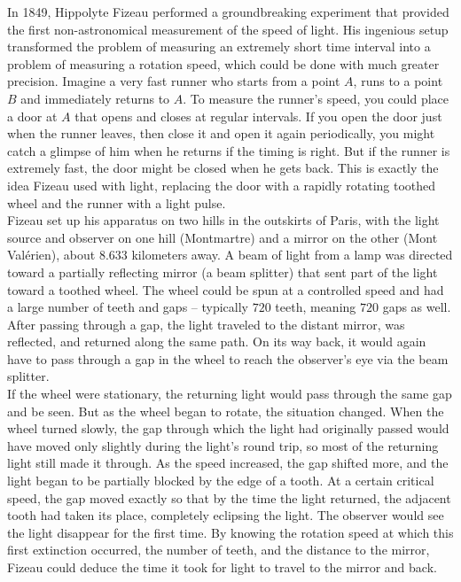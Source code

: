         In 1849, Hippolyte Fizeau performed a groundbreaking experiment that provided the first non-astronomical measurement of the speed of light. His ingenious setup transformed the problem of measuring an extremely short time interval into a problem of measuring a rotation speed, which could be done with much greater precision. Imagine a very fast runner who starts from a point $A$, runs to a point $B$ and immediately returns to $A$. To measure the runner's speed, you could place a door at $A$ that opens and closes at regular intervals. If you open the door just when the runner leaves, then close it and open it again periodically, you might catch a glimpse of him when he returns if the timing is right. But if the runner is extremely fast, the door might be closed when he gets back. This is exactly the idea Fizeau used with light, replacing the door with a rapidly rotating toothed wheel and the runner with a light pulse.\\

        Fizeau set up his apparatus on two hills in the outskirts of Paris, with the light source and observer on one hill (Montmartre) and a mirror on the other (Mont Valérien), about $8.633$ kilometers away. A beam of light from a lamp was directed toward a partially reflecting mirror (a beam splitter) that sent part of the light toward a toothed wheel. The wheel could be spun at a controlled speed and had a large number of teeth and gaps – typically $720$ teeth, meaning $720$ gaps as well. After passing through a gap, the light traveled to the distant mirror, was reflected, and returned along the same path. On its way back, it would again have to pass through a gap in the wheel to reach the observer's eye via the beam splitter.\\

        If the wheel were stationary, the returning light would pass through the same gap and be seen. But as the wheel began to rotate, the situation changed. When the wheel turned slowly, the gap through which the light had originally passed would have moved only slightly during the light's round trip, so most of the returning light still made it through. As the speed increased, the gap shifted more, and the light began to be partially blocked by the edge of a tooth. At a certain critical speed, the gap moved exactly so that by the time the light returned, the adjacent tooth had taken its place, completely eclipsing the light. The observer would see the light disappear for the first time. By knowing the rotation speed at which this first extinction occurred, the number of teeth, and the distance to the mirror, Fizeau could deduce the time it took for light to travel to the mirror and back.\\

